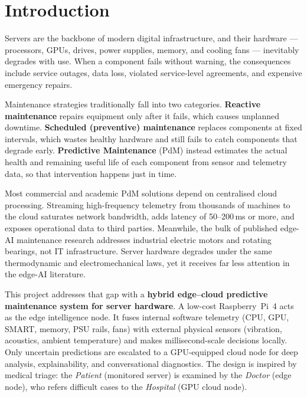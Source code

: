 \documentclass[12pt,a4paper]{report}
\begin{document}
\setcounter{page}{1}
\chapter{Introduction}

Servers are the backbone of modern digital infrastructure, and their hardware --- processors, GPUs, drives, power supplies, memory, and cooling fans --- inevitably degrades with use. When a component fails without warning, the consequences include service outages, data loss, violated service-level agreements, and expensive emergency repairs.

Maintenance strategies traditionally fall into two categories. \textbf{Reactive maintenance} repairs equipment only after it fails, which causes unplanned downtime. \textbf{Scheduled (preventive) maintenance} replaces components at fixed intervals, which wastes healthy hardware and still fails to catch components that degrade early. \textbf{Predictive Maintenance} (PdM) instead estimates the actual health and remaining useful life of each component from sensor and telemetry data, so that intervention happens just in time.

Most commercial and academic PdM solutions depend on centralised cloud processing. Streaming high-frequency telemetry from thousands of machines to the cloud saturates network bandwidth, adds latency of 50--200\,ms or more, and exposes operational data to third parties. Meanwhile, the bulk of published edge-AI maintenance research addresses industrial electric motors and rotating bearings, not IT infrastructure. Server hardware degrades under the same thermodynamic and electromechanical laws, yet it receives far less attention in the edge-AI literature.

This project addresses that gap with a \textbf{hybrid edge--cloud predictive maintenance system for server hardware}. A low-cost Raspberry~Pi~4 acts as the edge intelligence node. It fuses internal software telemetry (CPU, GPU, SMART, memory, PSU rails, fans) with external physical sensors (vibration, acoustics, ambient temperature) and makes millisecond-scale decisions locally. Only uncertain predictions are escalated to a GPU-equipped cloud node for deep analysis, explainability, and conversational diagnostics. The design is inspired by medical triage: the \emph{Patient} (monitored server) is examined by the \emph{Doctor} (edge node), who refers difficult cases to the \emph{Hospital} (GPU cloud node).
\end{document}
